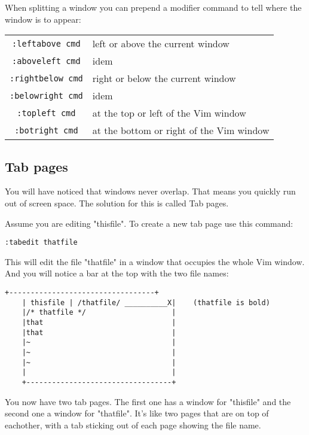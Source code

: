 When splitting a window you can prepend a modifier command to tell where the window is to appear:
\begin{center}
				\begin{longtable}{c l}
								\texttt{:leftabove {cmd}} & left or above the current window \\
								\texttt{:aboveleft {cmd}} & idem \\
								\texttt{:rightbelow {cmd}} & right or below the current window \\
								\texttt{:belowright {cmd}} & idem \\
								\texttt{:topleft {cmd}} & at the top or left of the Vim window \\
								\texttt{:botright {cmd}} & at the bottom or right of the Vim window \\
				\end{longtable}
\end{center}
\subsection{Tab pages}
You will have noticed that windows never overlap.
That means you quickly run out of screen space.
The solution for this is called Tab pages.

Assume you are editing "thisfile".
To create a new tab page use this command:

 \begin{Verbatim}[samepage=true]
 :tabedit thatfile
 \end{Verbatim}

This will edit the file "thatfile" in a window that occupies the whole Vim window.
And you will notice a bar at the top with the two file names:

		\begin{Verbatim}[samepage=true]
    +----------------------------------+
    | thisfile | /thatfile/ __________X|    (thatfile is bold)
    |/* thatfile */                    |
    |that                              |
    |that                              |
    |~                                 |
    |~                                 |
    |~                                 |
    |                                  |
    +----------------------------------+
						\end{Verbatim}

You now have two tab pages.
The first one has a window for "thisfile" and the second one a window for "thatfile".
It's like two pages that are on top of eachother, with a tab sticking out of each page showing the file name.

